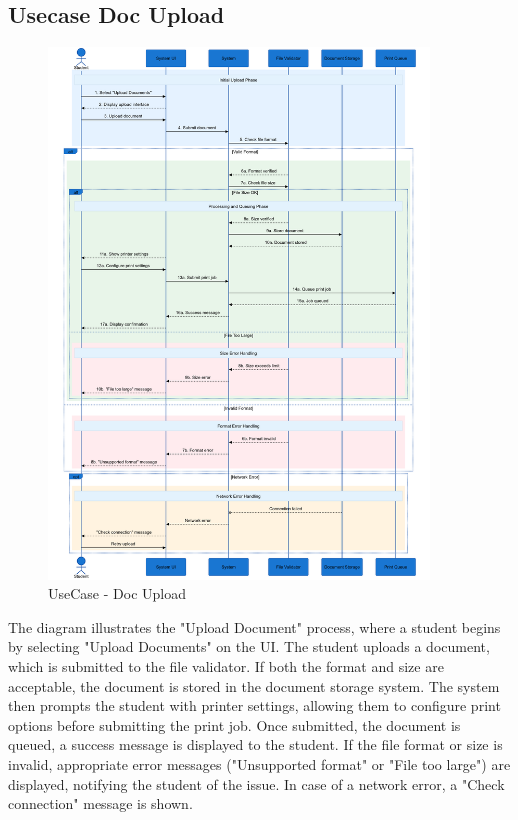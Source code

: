 \documentclass[a4paper]{report}
\begin{document}
\subsection{Usecase Doc Upload}

\begin{figure}[H]
    \centering
    \includegraphics[width=0.9\textwidth]{images/sequence_diagram/Upload Doc.png}
    \caption{UseCase - Doc Upload}
    \label{fig:upload_doc}
\end{figure}

The diagram illustrates the "Upload Document" process, where a student begins by selecting "Upload Documents" on the UI. The student uploads a document, which is submitted to the file validator. If both the format and size are acceptable, the document is stored in the document storage system. The system then prompts the student with printer settings, allowing them to configure print options before submitting the print job. Once submitted, the document is queued, a success message is displayed to the student. If the file format or size is invalid, appropriate error messages ("Unsupported format" or "File too large") are displayed, notifying the student of the issue. In case of a network error, a "Check connection" message is shown.
\end{document}
